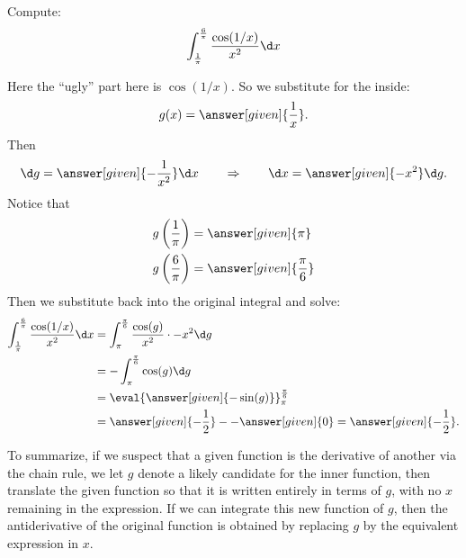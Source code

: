 \documentclass{ximera}
\begin{document}
\begin{example}
  Compute:
  \[
  \int_{\frac{1}{\pi}}^{{\frac{6}{\pi}}} \frac{\cos(1/x)}{x^2} \d x
  \]
\begin{explanation}
Here the ``ugly'' part here is $\cos(1/x)$.  So we substitute for
the inside:
\[
g(x)=\answer[given]{\frac{1}{x}}.
\]
Then
\[
\d g =  \answer[given]{-\frac{1}{x^2}} \d x 	\qquad	\Rightarrow	\qquad	\d x = \answer[given]{-x^2} \d g.
\]
Notice that
\begin{align*}
g\left(\frac{1}{\pi}\right) &= \answer[given]{\pi} \\
g\left(\frac{6}{\pi}\right) &= \answer[given]{\frac{\pi}{6}} \\
\end{align*}
Then we substitute back into the original integral and solve:
\begin{align*}
\int_{\frac{1}{\pi}}^{\frac{6}{\pi}} \frac{\cos(1/x)}{x^2} \d x &= \int_{\pi}^{\frac{\pi}{6}} \frac{\cos(g)}{x^2}\cdot -x^2 \d g  \\
&= -\int_\pi^{\frac{\pi}{6}} \cos(g) \d g  \\
&= \eval{\answer[given]{-\sin(g)}}_{\pi}^{\frac{\pi}{6}}  \\
&= \answer[given]{-\frac{1}{2}} - -\answer[given]{0} = \answer[given]{-\frac{1}{2}}.
\end{align*}
\end{explanation}
\end{example}

To summarize, if we suspect that a given function is the derivative of
another via the chain rule, we let $g$ denote a likely candidate for
the inner function, then translate the given function so that it is
written entirely in terms of $g$, with no $x$ remaining in the
expression. If we can integrate this new function of $g$, then the
antiderivative of the original function is obtained by replacing $g$
by the equivalent expression in $x$.
\end{document}

